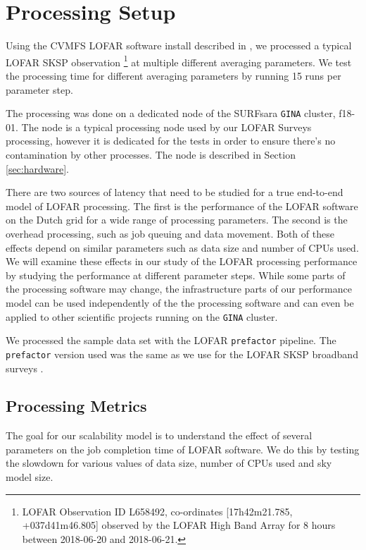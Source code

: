 \section{Processing Setup }\label{sec:methods}
Using the CVMFS LOFAR software install described in \citep{mechev17}, we processed a typical LOFAR SKSP observation \footnote{LOFAR Observation ID L658492, co-ordinates [17h42m21.785, +037d41m46.805] observed by the LOFAR High Band Array for 8 hours between 2018-06-20 and 2018-06-21. } at multiple different averaging parameters. We test the processing time for different averaging parameters by running 15 runs per parameter step. 

The processing was done on a dedicated node of the SURFsara \texttt{GINA} cluster, f18-01. The node is a typical processing node used by our LOFAR Surveys processing, however it is dedicated for the tests in order to ensure there's no contamination by other processes. The node is described in Section \ref{sec:hardware}. 
     
There are two sources of latency that need to be studied for a true end-to-end model of LOFAR processing. The first is the performance of the LOFAR software on the Dutch grid for a wide range of processing parameters. The second is the overhead processing, such as job queuing and data movement. Both of these effects depend on similar parameters such as data size and number of CPUs used. We will examine these effects in our study of the LOFAR processing performance by studying the performance at different parameter steps. While some parts of the processing software may change, the infrastructure parts of our performance model can be used independently of the the processing software and can even be applied to other scientific projects running on the \texttt{GINA} cluster. 

We processed the sample data set with the LOFAR \texttt{prefactor} pipeline. The \texttt{prefactor} version used was the same as we use for the LOFAR SKSP broadband surveys \citep{prefactor_zenodo}. 

\subsection{Processing Metrics}
The goal for our scalability model is to understand the effect of several parameters on the job completion time of LOFAR software. We do this by testing the slowdown for various values of data size, number of CPUs used and sky model size. 

